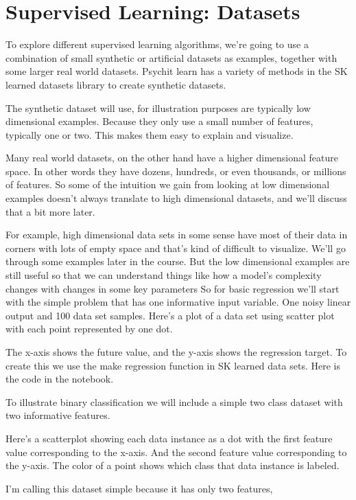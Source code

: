\section{Supervised Learning: Datasets}
\begin{multicols}{2}

To explore different supervised learning algorithms, we're going to use a combination of small synthetic or artificial datasets as examples, together with some larger real world datasets. Psychit learn has a variety of methods in the SK learned datasets library to create synthetic datasets. 

The synthetic dataset will use, for illustration purposes are typically low dimensional examples. Because they only use a small number of features, typically one or two. This makes them easy to explain and visualize. 

Many real world datasets, on the other hand have a higher dimensional feature space. In other words they have dozens, hundreds, or even thousands, or millions of features. So some of the intuition we gain from looking at low dimensional examples doesn't always translate to high dimensional datasets, and we'll discuss that a bit more later. 

For example, high dimensional data sets in some sense have most of their data in corners with lots of empty space and that's kind of difficult to visualize. We'll go through some examples later in the course. But the low dimensional examples are still useful so that we can understand things like how a model's complexity changes with changes in some key parameters So for basic regression we'll start with the simple problem that has one informative input variable. One noisy linear output and 100 data set samples. Here's a plot of a data set using scatter plot with each point represented by one dot. 

The x-axis shows the future value, and the y-axis shows the regression target. To create this we use the make regression function in SK learned data sets. Here is the code in the notebook. 

To illustrate binary classification we will include a simple two class dataset with two informative features. 

Here's a scatterplot showing each data instance as a dot with the first feature value corresponding to the x-axis. And the second feature value corresponding to the y-axis. The color of a point shows which class that data instance is labeled. 

I'm calling this dataset simple because it has only two features, 


\end{multicols}
